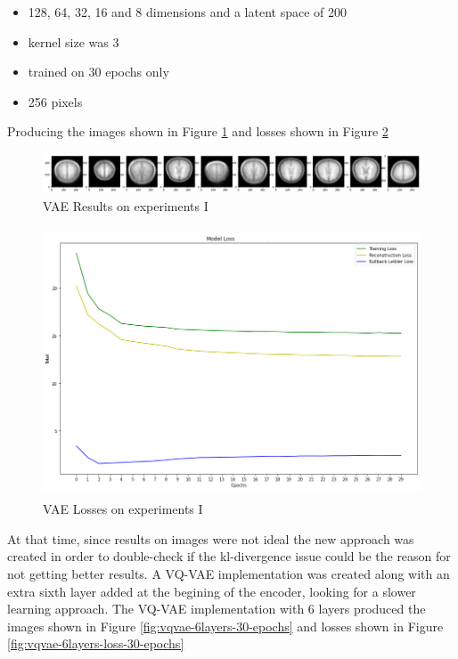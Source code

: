 \begin{itemize}
    \item 128, 64, 32, 16 and 8 dimensions and a latent space of 200
    \item kernel size was 3
    \item trained on 30 epochs only
    \item 256 pixels
\end{itemize}

Producing the images shown in Figure \ref*{fig:vae-k3-brains-30-epochs} and losses shown in Figure \ref*{fig:vae-k3-loss-30-epochs}

\begin{figure}[ht]
    \centering
    \includegraphics[width = 17cm]{images/vae-k3-brains-30-epochs.png}
    \caption[VAE Results on experiments I]{VAE Results on experiments I}
    \label{fig:vae-k3-brains-30-epochs}
\end{figure}

\begin{figure}[ht]
    \centering
    \includegraphics[width = 14cm, height=8cm]{images/vae-k3-loss-30-epochs.png}
    \caption[VAE Losses on experiments I]{VAE Losses on experiments I}
    \label{fig:vae-k3-loss-30-epochs}
\end{figure}

At that time, since results on images were not ideal the new approach was created in order to double-check if the kl-divergence issue could be the reason for not getting better results. A VQ-VAE implementation was created along with an extra sixth layer added at the begining of the encoder, looking for a slower learning approach. The VQ-VAE implementation with 6 layers produced the images shown in Figure \ref*{fig:vqvae-6layers-30-epochs} and losses shown in Figure \ref*{fig:vqvae-6layers-loss-30-epochs}

